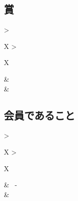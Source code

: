\documentclass[fontsize=12pt]{ltjarticle}
\begin{document}
\subsection*{賞}

\begin{center}
  \begin{tabularx}{\textwidth} { 
      >{\raggedright\arraybackslash}X 
    >{\raggedright\arraybackslash}X  }

    \csvreader[awards]{data/awards.csv}{}{
    \textbf{\award} & \year\\
    \textit{\place} & \\
    }
  \end{tabularx}
\end{center}

\subsection*{会員であること}

\begin{center}
  \begin{tabularx}{\textwidth} { 
      >{\raggedright\arraybackslash}X 
    >{\raggedright\arraybackslash}X  }

    \csvreader[memberships]{data/memberships.csv}{}{
    \textbf{\role} & \start \ - \ \fin\\
    \textit{\org} & \\
    }
  \end{tabularx}
\end{center}
\end{document}
